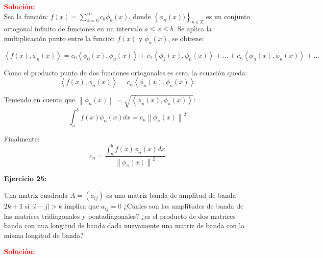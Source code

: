 \documentclass[12pt]{article}
\begin{document}
\noindent \textcolor{red}{\bf Solución:}\\

Sea la función: $f(x) = \sum_{k=0}^{\infty} c_k \phi_k (x)$, donde $\left \{ \phi _n(x)) \right \}_{ n \in \mathbb{Z} }$ es un conjunto ortogonal infinito de funciones en un intervalo $a \leq x \leq b$. Se aplica la multiplicación punto entre la funcion $f(x)$ y $\phi_n(x)$, se obtiene:

\begin{equation}
    \left \langle f(x),\phi_n(x) \right \rangle = c_0 \left \langle \phi_0(x),\phi_n(x) \right \rangle 
                                                + c_1 \left \langle \phi_1(x),\phi_n(x) \right \rangle
                                                + \dots
                                                + c_n \left \langle \phi_n(x),\phi_n(x) \right \rangle
                                                + \dots
\end{equation}

Como el producto punto de dos funciones ortogonales es cero, la ecuación queda:
\begin{equation}
    \left \langle f(x),\phi_n(x) \right \rangle = c_n \left \langle \phi_n(x),\phi_n(x) \right \rangle
\end{equation}

Teniendo en cuenta que $\left\| \phi_n (x) \right\| = \sqrt{\left \langle \phi_n(x),\phi_n(x) \right \rangle}$:
\begin{equation}
    \int_{a}^{b} f(x) \phi_n (x)  dx = c_n \left \| \phi_n (x) \right \|^2
\end{equation}

Finalmente:
\begin{equation}
    c_n=\frac{\int_{a}^{b} f(x) \phi_n (x)  dx }{ \left \| \phi_n (x) \right \|^2 }
\end{equation}




%
\noindent \textbf{Ejercicio 25:}

Una matriz cuadrada $A = (a_{ij})$ es una matriz banda de amplitud de banda $2k+1$ si $\vert i - j\vert > k$ implica que $a_{ij} = 0$ ¿Cuales son las amplitudes de banda de las matrices tridiagonales y pentadiagonales? ¿es el producto de dos matrices banda con una longitud de banda dada nuevamente una matriz de banda con la misma longitud de banda?

\noindent \textcolor{red}{\bf Solución:}
\end{document}

